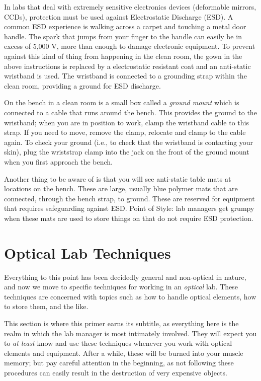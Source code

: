 \documentclass[11pt]{article}
\begin{document}
In labs that deal with extremely sensitive electronics devices (deformable mirrors, CCDs), protection must be used against Electrostatic Discharge (ESD). A common ESD experience is walking across a carpet and touching a metal door handle. The spark that jumps from your finger to the handle can easily be in excess of 5,000 V, more than enough to damage electronic equipment. To prevent against this kind of thing from happening in the clean room, the gown in the above instructions is replaced by a electrostatic resistant coat and an anti-static wristband is used. The wristband is connected to a grounding strap within the clean room, providing a ground for ESD discharge. 

On the bench in a clean room is a small box called a \textit{ground mount} which is connected to a cable that runs around the bench. This provides the ground to the wristband; when you are in position to work, clamp the wristband cable to this strap. If you need to move, remove the clamp, relocate and clamp to the cable again. To check your ground (i.e., to check that the wristband is contacting your skin), plug the wriststrap clamp into the jack on the front of the ground mount when you first approach the bench.

Another thing to be aware of is that you will see anti-static table mats at locations on the bench. These are large, usually blue polymer mats that are connected, through the bench strap, to ground. These are reserved for equipment that requires safeguarding against ESD. Point of Style: lab managers get grumpy when these mats are used to store things on that do not require ESD protection.


\section{Optical Lab Techniques}
\label{sec:Technique}

Everything to this point has been decidedly general and non-optical in nature, and now we move to specific techniques for working in an \textit{optical} lab. These techniques are concerned with topics such as how to handle optical elements, how to store them, and the like.

This section is where this primer earns its subtitle, as everything here is the realm in which the lab manager is most intimately involved. They will expect you to \textit{at least} know and use these techniques whenever you work with optical elements and equipment. After a while, these will be burned into your muscle memory; but pay careful attention in the beginning, as not following these procedures can easily result in the destruction of very expensive objects. 
\end{document}
